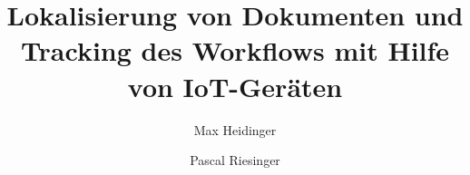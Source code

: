 \usepackage{ifthen}

\usepackage{titling}         %

\author{Max Heidinger \and Pascal Riesinger}

\title{Lokalisierung von Dokumenten und Tracking des Workflows mit Hilfe von IoT-Geräten}

\newcommand{\arbeit}{Studienarbeit}
\newcommand{\studiengang}{Informatik}
\newcommand{\studienjahr}{2017}
\newcommand{\verfassungsort}{Karlsruhe}
\newcommand{\kurs}{TINF17B1}
\newcommand{\bearbeitungsmonat}{Mai 2020}
\newcommand{\abgabe}{18.05.2020}
\newcommand{\bearbeitungszeitraum}{01.10.2019 - 18.05.2020}
\newcommand{\betreuerDhbw}{Prof. Dr. Marcus Strand}

